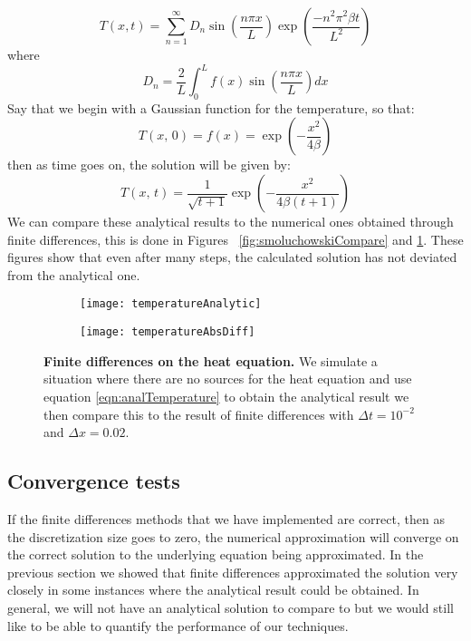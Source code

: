 \begin{equation}
T(x, t) = \sum_{n=1}^\infty D_n \sin \left(\frac{n \pi x}{L} \right) \exp\left(\frac{-n^2 \pi^2 \beta t}{L^2}\right)  \label{eqn:analTemperature}
\end{equation}
where
\begin{equation}
D_n = \frac{2}{L} \int_0^L f(x) \sin \left(\frac{n \pi x}{L} \right) dx
\end{equation}
Say that we begin with a Gaussian function for the temperature, so that:
\begin{equation}
T(x, \, 0) = f(x) =  \exp{\left (-\frac{x^2}{4 \beta} \right)}
\end{equation}
then as time goes on, the solution will be given by:
\begin{equation}
T(x, \, t) = \frac{1}{\sqrt{t + 1}} \exp{ \left(-\frac{x^2}{4 \beta (t + 1)} \right)}
\end{equation}
We can compare these analytical results to the numerical ones obtained through finite differences, this is done in Figures ~\ref{fig:smoluchowskiCompare} and \ref{fig:temperatureCompare}. These figures show that even after many steps, the calculated solution has not deviated from the analytical one.

\begin{figure}
	\center
	\begin{subfigure}{0.45\textwidth}
	\texttt{[image: temperatureAnalytic]}
	\end{subfigure}
	\begin{subfigure}{0.45\textwidth}
	\texttt{[image: temperatureAbsDiff]}
	\end{subfigure}
	\caption{\textbf{Finite differences on the heat equation.} We simulate a situation where there are no sources for the heat equation and use equation \ref{eqn:analTemperature} to obtain the analytical result we then compare this to the result of finite differences with $\Delta t = 10^{-2}$ and $\Delta x = 0.02$. \label{fig:temperatureCompare}}
\end{figure}

\subsection{Convergence tests}
If the finite differences methods that we have implemented are correct, then as the discretization size goes to zero, the numerical approximation will converge on the correct solution to the underlying equation being approximated. In the previous section we showed that finite differences approximated the solution very closely in some instances where the analytical result could be obtained. In general, we will not have an analytical solution to compare to but we would still like to be able to quantify the performance of our techniques.


